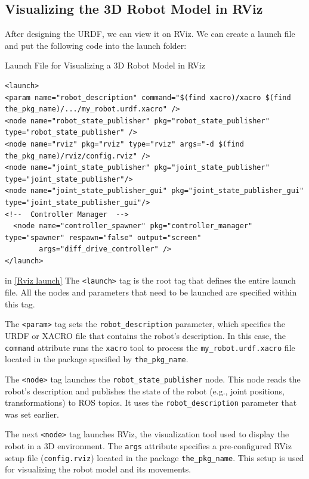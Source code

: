 \documentclass[../../main]{subfiles}
\begin{document}
\subsection{Visualizing the 3D Robot Model in RViz}
After designing the URDF, we can view it on RViz.
We can create a launch file and put the following code into the launch folder:
\begin{codebox}[label=Rviz launch]{Launch File for Visualizing a 3D Robot Model in RViz}
  \begin{verbatim}
<launch>
<param name="robot_description" command="$(find xacro)/xacro $(find the_pkg_name)/.../my_robot.urdf.xacro" />
<node name="robot_state_publisher" pkg="robot_state_publisher" type="robot_state_publisher" />
<node name="rviz" pkg="rviz" type="rviz" args="-d $(find the_pkg_name)/rviz/config.rviz" />
<node name="joint_state_publisher" pkg="joint_state_publisher" 
type="joint_state_publisher"/>
<node name="joint_state_publisher_gui" pkg="joint_state_publisher_gui" type="joint_state_publisher_gui"/>
<!--  Controller Manager  -->
  <node name="controller_spawner" pkg="controller_manager" type="spawner" respawn="false" output="screen"
        args="diff_drive_controller" /> 
</launch>
    \end{verbatim}
  \end{codebox}
in \cref{Rviz launch} The \texttt{<launch>} tag is the root tag that defines the entire launch file. All the nodes and parameters that need to be launched are specified within this tag.

    The \texttt{<param>} tag sets the \texttt{robot\_description} parameter, which specifies the URDF or XACRO file that contains the robot’s description. In this case, the \texttt{command} attribute runs the \texttt{xacro} tool to process the \texttt{my\_robot.urdf.xacro} file located in the package specified by \texttt{the\_pkg\_name}.
    
    The \texttt{<node>} tag launches the \texttt{robot\_state\_publisher} node. This node reads the robot’s description and publishes the state of the robot (e.g., joint positions, transformations) to ROS topics. It uses the \texttt{robot\_description} parameter that was set earlier.
    
    The next \texttt{<node>} tag launches RViz, the visualization tool used to display the robot in a 3D environment. The \texttt{args} attribute specifies a pre-configured RViz setup file (\texttt{config.rviz}) located in the package \texttt{the\_pkg\_name}. This setup is used for visualizing the robot model and its movements.
    
\end{document}
